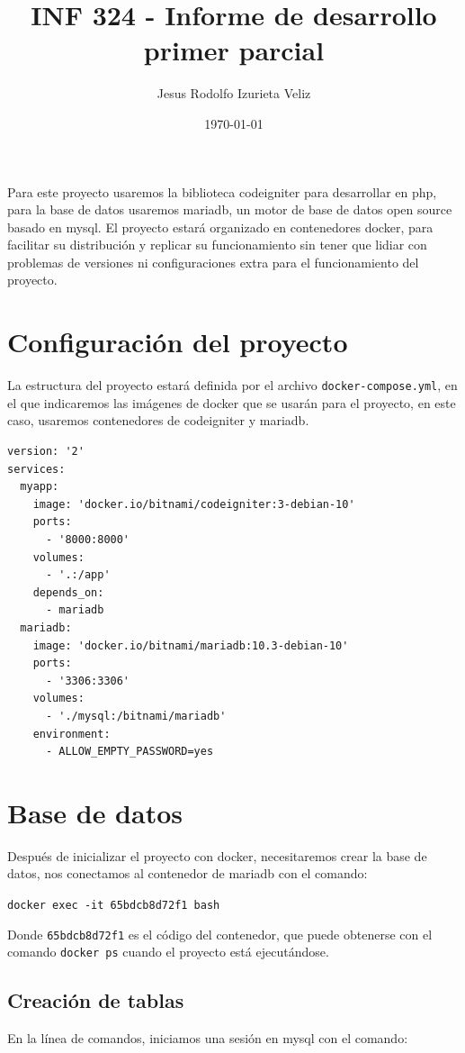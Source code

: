 \documentclass[letter]{article}
\author{Jesus Rodolfo Izurieta Veliz}
\date{\today}
\title{INF 324 - Informe de desarrollo primer parcial}
\begin{document}
\maketitle
Para este proyecto usaremos la biblioteca codeigniter para desarrollar en php,
para la base de datos usaremos mariadb, un motor de base de datos open source
basado en mysql. El proyecto estará organizado en contenedores docker, para
facilitar su distribución y replicar su funcionamiento sin tener que lidiar con
problemas de versiones ni configuraciones extra para el funcionamiento del
proyecto.

\section{Configuración del proyecto}
\label{sec:org0569705}
La estructura del proyecto estará definida por el archivo \texttt{docker-compose.yml},
en el que indicaremos las imágenes de docker que se usarán para el proyecto, en
este caso, usaremos contenedores de codeigniter y mariadb.

\begin{verbatim}
version: '2'
services:
  myapp:
    image: 'docker.io/bitnami/codeigniter:3-debian-10'
    ports:
      - '8000:8000'
    volumes:
      - '.:/app'
    depends_on:
      - mariadb
  mariadb:
    image: 'docker.io/bitnami/mariadb:10.3-debian-10'
    ports:
      - '3306:3306'
    volumes:
      - './mysql:/bitnami/mariadb'
    environment:
      - ALLOW_EMPTY_PASSWORD=yes
\end{verbatim}

\section{Base de datos}
\label{sec:orgb14ae8d}
Después de inicializar el proyecto con docker, necesitaremos crear la base de
datos, nos conectamos al contenedor de mariadb con el comando:

\texttt{docker exec -it 65bdcb8d72f1 bash}

Donde \texttt{65bdcb8d72f1} es el código del contenedor, que puede obtenerse con el
comando \texttt{docker ps} cuando el proyecto está ejecutándose.

\subsection{Creación de tablas}
\label{sec:orgd3f31bc}
En la línea de comandos, iniciamos una sesión en mysql con el comando:
\end{document}
